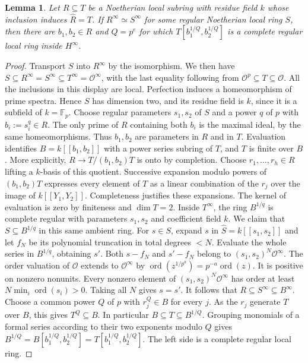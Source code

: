 \documentclass[11pt,a4paper]{amsart}
\numberwithin{equation}{section}
\newtheorem{lemma}[theorem]{Lemma}
\DeclareMathOperator{\ord}{ord}
\newcommand{\F}{\mathbb F}
\newcommand{\perf}{^{\infty}}
\begin{document}
\begin{lemma}\label{lem:model}
Let $R\subseteq T$ be a Noetherian local subring with residue field
 $k$ whose inclusion induces $\widehat R=T$. If
$R\perf\simeq S\perf$ for some regular Noetherian local ring $S$,
then there are $b_1,b_2\in R$ and $Q=p^e$ for which
$	T[b_1^{1/Q},b_2^{1/Q}]$
is a complete regular local ring inside $H\perf$.
\end{lemma}
\begin{proof} Transport $S$ into $R\perf$ by the isomorphism. We then have
$S\subseteq R\perf=S\perf\subseteq T\perf=	\mathcal{O}\perf$, with the last
equality following from $	\mathcal{O}^p\subseteq T\subseteq 	\mathcal{O}$.
All the inclusions in this display are local. Perfection induces a
homeomorphism of prime spectra. Hence $S$ has dimension two, and
its residue field is $k$, since it is a subfield of $k=\F_p$.
	Choose regular parameters $s_1,s_2$ of $S$ and a power $q$ of
$p$ with $b_i:=s_i^q\in R$. The only prime of $R$ containing
both $b_i$ is the maximal ideal, by the same homeomorphisms.
Thus $b_1,b_2$ are parameters in $R$ and in $T$.
Evaluation identifies $B=k[[b_1,b_2]]$ with a power series subring
of $T$, and $T$ is finite over $B$. More explicitly,
$R\to T/(b_1,b_2)T$ is onto by completion. Choose
$r_1,\ldots,r_h\in R$ lifting a $k$-basis of this quotient.
Successive expansion modulo powers of $(b_1,b_2)T$ expresses every
element of $T$ as a linear combination of the $r_j$ over the
image of $k[[Y_1,Y_2]]$. Completeness justifies these expansions.
The kernel of evaluation is zero by finiteness and $\dim T=2$.
Inside $T\perf$, the ring $B^{1/q}$ is complete regular with
parameters $s_1,s_2$ and coefficient field $k$. We claim that
$S\subseteq B^{1/q}$ in this same ambient ring. For $s\in S$,
expand $s$ in $\widehat S=k[[s_1,s_2]]$ and let $f_N$ be its
polynomial truncation in total degrees $<N$. Evaluate the whole
series in $B^{1/q}$, obtaining $s'$. Both $s-f_N$ and
$s'-f_N$ belong to $(s_1,s_2)^N 	\mathcal{O}\perf$. The order valuation
of $	\mathcal{O}$ extends to $\mathcal{O}\perf$ by
$\ord(z^{1/p^a})=p^{-a}\ord(z)$. It is positive on nonzero
nonunits. Every nonzero element of $(s_1,s_2)^N 	\mathcal{O}\perf$ has order
at least $N\min_i\ord(s_i)>0$. Taking all $N$ gives $s=s'$.
It follows that $R\subseteq S\perf\subseteq B\perf$. Choose a common
power $Q$ of $p$ with $r_j^Q\in B$ for every $j$. As the
$r_j$ generate $T$ over $B$, this gives $T^Q\subseteq B$.
In particular $B\subseteq T\subseteq B^{1/Q}$. Grouping monomials
of a formal series according to their two exponents modulo $Q$ gives
$B^{1/Q}=B[b_1^{1/Q},b_2^{1/Q}]
 		=T[b_1^{1/Q},b_2^{1/Q}].$
The left side is a complete regular local ring.
\end{proof}
\end{document}
